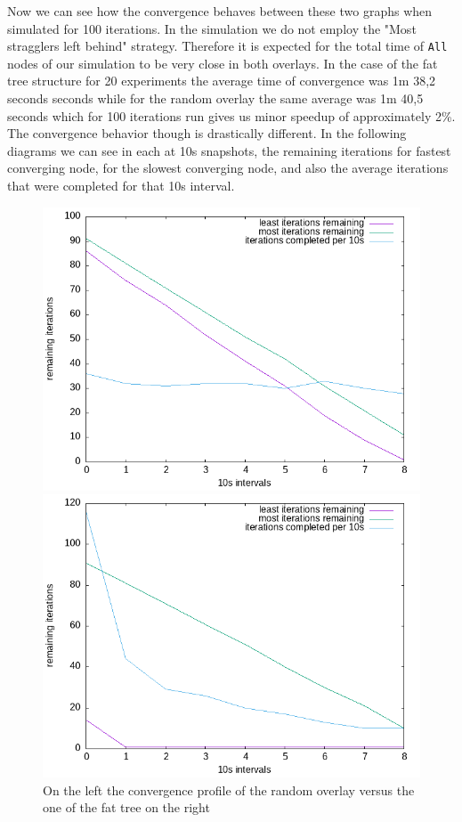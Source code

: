 \documentclass[12pt,notitlepage]{article}
\begin{document}
Now we can see how the convergence behaves between these two graphs when simulated for 100 iterations. In the simulation we do not employ the "Most stragglers left behind" strategy.
Therefore it is expected for the total time of {\tt All} nodes of our simulation to be very close in both overlays. In the case of the fat tree structure for 20 experiments
the average time of convergence was 1m 38,2 seconds seconds while  for the random overlay the same average was 1m 40,5 seconds which for 100 iterations run
gives us minor speedup of approximately 2\%. The convergence behavior though is drastically different. In the following diagrams we can see in each
at 10s snapshots, the remaining iterations for fastest converging node, for the slowest converging node, and also the average iterations that were completed for that 10s interval.
\begin{figure}
\centering
\begin{minipage}{.5\linewidth}
\centering
\includegraphics[scale=0.4]{img/random-1m40.png}
\end{minipage}%
\begin{minipage}{.5\linewidth}
\centering
\includegraphics[scale=0.4]{img/fat-1m38.png}
\end{minipage}
\caption{On the left the convergence profile of the random overlay versus the one of the fat tree on the right}
\end{figure}
\end{document}
